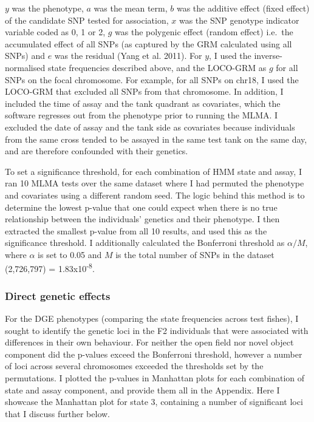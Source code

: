 \documentclass[
]{book}
\begin{document}
\(y\) was the phenotype, \(a\) was the mean term, \(b\) was the additive effect (fixed effect) of the candidate SNP tested for association, \(x\) was the SNP genotype indicator variable coded as 0, 1 or 2, \(g\) was the polygenic effect (random effect) i.e.~the accumulated effect of all SNPs (as captured by the GRM calculated using all SNPs) and \(e\) was the residual (Yang et al. 2011). For \(y\), I used the inverse-normalised state frequencies described above, and the LOCO-GRM as \(g\) for all SNPs on the focal chromosome. For example, for all SNPs on chr18, I used the LOCO-GRM that excluded all SNPs from that chromosome. In addition, I included the time of assay and the tank quadrant as covariates, which the software regresses out from the phenotype prior to running the MLMA. I excluded the date of assay and the tank side as covariates because individuals from the same cross tended to be assayed in the same test tank on the same day, and are therefore confounded with their genetics.

To set a significance threshold, for each combination of HMM state and assay, I ran 10 MLMA tests over the same dataset where I had permuted the phenotype and covariates using a different random seed. The logic behind this method is to determine the lowest p-value that one could expect when there is no true relationship between the individuals' genetics and their phenotype. I then extracted the smallest p-value from all 10 results, and used this as the significance threshold. I additionally calculated the Bonferroni threshold as \(\alpha / M\), where \(\alpha\) is set to 0.05 and \(M\) is the total number of SNPs in the dataset (2,726,797) = 1.83x10\textsuperscript{-8}.

\hypertarget{direct-genetic-effects-1}{%
\subsubsection{Direct genetic effects}\label{direct-genetic-effects-1}}

For the DGE phenotypes (comparing the state frequencies across test fishes), I sought to identify the genetic loci in the F2 individuals that were associated with differences in their own behaviour. For neither the open field nor novel object component did the p-values exceed the Bonferroni threshold, however a number of loci across several chromosomes exceeded the thresholds set by the permutations. I plotted the p-values in Manhattan plots for each combination of state and assay component, and provide them all in the Appendix. Here I showcase the Manhattan plot for state 3, containing a number of significant loci that I discuss further below.
\end{document}

